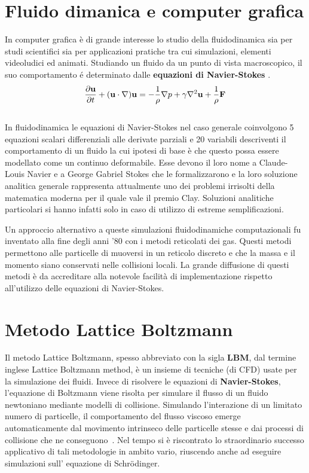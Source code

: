 \large
\section{Fluido dimanica e computer grafica}
In computer grafica \`e di grande interesse lo studio della fluidodinamica sia per studi scientifici sia per applicazioni pratiche tra cui simulazioni, elementi videoludici ed animati. Studiando un fluido da un punto di vista macroscopico, il suo comportamento \'e determinato dalle \textbf{equazioni di Navier-Stokes }.\\
$$ {\partial{\bf u}\over{\partial t}} + ({\bf u} \cdot \nabla) {\bf u} = - {1\over\rho} \nabla p + \gamma\nabla^2{\bf u} + {1\over\rho}{\bf F} $$
\\ %
In fluidodinamica le equazioni di Navier-Stokes  nel caso generale coinvolgono 5 equazioni scalari differenziali alle derivate parziali e 20 variabili descriventi il comportamento di un fluido la cui ipotesi di base \`e che questo possa essere modellato come un continuo deformabile. Esse devono il loro nome a Claude-Louis Navier e a George Gabriel Stokes che le formalizzarono e la loro soluzione analitica generale rappresenta attualmente uno dei problemi irrisolti della matematica moderna per il quale vale il premio Clay. Soluzioni analitiche particolari si hanno infatti solo in caso di utilizzo di estreme semplificazioni.

Un approccio alternativo a queste simulazioni fluidodinamiche computazionali fu inventato alla fine degli anni '80 con i metodi reticolati dei gas. Questi metodi permettono alle particelle di muoversi in un reticolo discreto e che la massa e il momento siano conservati nelle collisioni locali. La grande diffusione di questi metodi \`e da accreditare alla notevole facilit\`a di implementazione rispetto all'utilizzo delle equazioni di Navier-Stokes.

\section{Metodo Lattice Boltzmann}
Il metodo Lattice Boltzmann, spesso abbreviato con la sigla \textbf{LBM}, dal termine inglese Lattice Boltzmann method, \`e un insieme di tecniche (di CFD) usate per la simulazione dei fluidi. Invece di risolvere le equazioni di \textbf{Navier-Stokes}, l'equazione di Boltzmann viene risolta per simulare il flusso di un fluido newtoniano mediante modelli di collisione. Simulando l'interazione di un limitato numero di particelle, il comportamento del flusso viscoso emerge automaticamente dal movimento intrinseco delle particelle stesse e dai processi di collisione che ne conseguono~\cite{sb:2017}. Nel tempo si \`e riscontrato lo straordinario successo applicativo di tali metodologie in ambito vario, riuscendo anche ad eseguire simulazioni sull' equazione di Schr\"odinger.
 
